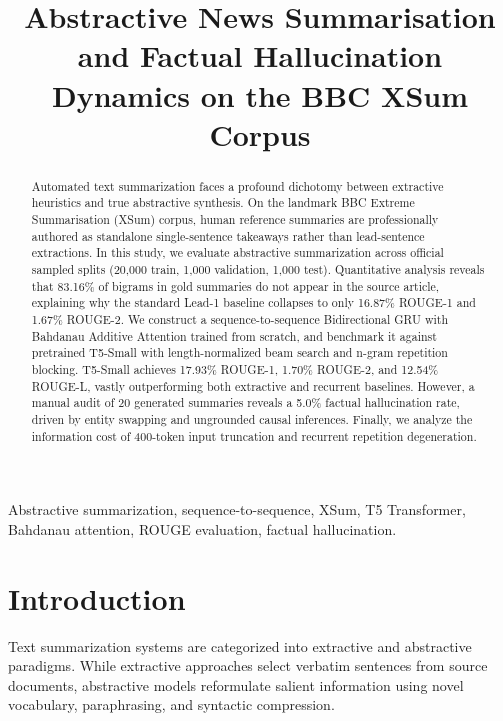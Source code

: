 \documentclass[conference]{IEEEtran}
\begin{document}
\title{Abstractive News Summarisation and Factual Hallucination Dynamics on the BBC XSum Corpus}

\author{
}

\maketitle

\begin{abstract}
Automated text summarization faces a profound dichotomy between extractive heuristics and true abstractive synthesis. On the landmark BBC Extreme Summarisation (XSum) corpus, human reference summaries are professionally authored as standalone single-sentence takeaways rather than lead-sentence extractions. In this study, we evaluate abstractive summarization across official sampled splits (20,000 train, 1,000 validation, 1,000 test). Quantitative analysis reveals that 83.16\% of bigrams in gold summaries do not appear in the source article, explaining why the standard Lead-1 baseline collapses to only 16.87\% ROUGE-1 and 1.67\% ROUGE-2. We construct a sequence-to-sequence Bidirectional GRU with Bahdanau Additive Attention trained from scratch, and benchmark it against pretrained T5-Small with length-normalized beam search and n-gram repetition blocking. T5-Small achieves 17.93\% ROUGE-1, 1.70\% ROUGE-2, and 12.54\% ROUGE-L, vastly outperforming both extractive and recurrent baselines. However, a manual audit of 20 generated summaries reveals a 5.0\% factual hallucination rate, driven by entity swapping and ungrounded causal inferences. Finally, we analyze the information cost of 400-token input truncation and recurrent repetition degeneration.
\end{abstract}

\begin{IEEEkeywords}
Abstractive summarization, sequence-to-sequence, XSum, T5 Transformer, Bahdanau attention, ROUGE evaluation, factual hallucination.
\end{IEEEkeywords}

\section{Introduction}
Text summarization systems are categorized into extractive and abstractive paradigms. While extractive approaches select verbatim sentences from source documents, abstractive models reformulate salient information using novel vocabulary, paraphrasing, and syntactic compression.
\end{document}
